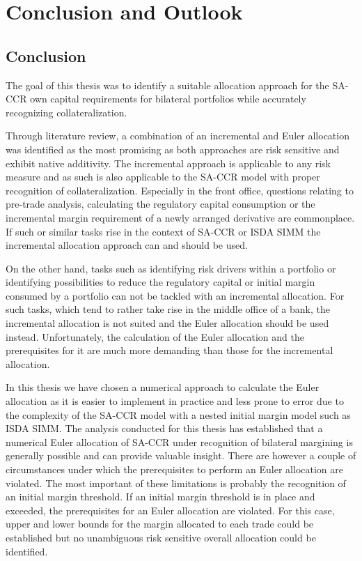 \documentclass[../Thesis_AHoecherl.tex]{subfiles}
\begin{document}
\chapter{Conclusion and Outlook}\label{sec:Outlook and Conclusion}
\section{Conclusion}\label{sec:Conclusion}
The goal of this thesis was to identify a suitable allocation approach for the \gls{SA-CCR} own capital requirements for bilateral portfolios while accurately recognizing collateralization.

Through literature review, a combination of an incremental and Euler allocation was identified as the most promising as both approaches are risk sensitive and exhibit native additivity. 
The incremental approach is applicable to any risk measure and as such is also applicable to the \gls{SA-CCR} model with proper recognition of collateralization. Especially in the front office, questions relating to pre-trade analysis, calculating the regulatory capital consumption or the incremental margin requirement of a newly arranged derivative are commonplace.
If such or similar tasks rise in the context of \gls{SA-CCR} or \gls{ISDA SIMM} the incremental allocation approach can and should be used.

On the other hand, tasks such as identifying risk drivers within a portfolio or identifying possibilities to reduce the regulatory capital or initial margin consumed by a portfolio can not be tackled with an incremental allocation.
For such tasks, which tend to rather take rise in the middle office of a bank, the incremental allocation is not suited and the Euler allocation should be used instead.
Unfortunately, the calculation of the Euler allocation and the prerequisites for it are much more demanding than those for the incremental allocation.

In this thesis we have chosen a numerical approach to calculate the Euler allocation as it is easier to implement in practice and less prone to error due to the complexity of the \gls{SA-CCR} model with a nested initial margin model such as \gls{ISDA SIMM}.
The analysis conducted for this thesis has established that a numerical Euler allocation of \gls{SA-CCR} under recognition of bilateral margining is generally possible and can provide valuable insight. There are however a couple of circumstances under which the prerequisites to perform an Euler allocation are violated.
The most important of these limitations is probably the recognition of an initial margin threshold. If an initial margin threshold is in place and exceeded, the prerequisites for an Euler allocation are violated. 
For this case, upper and lower bounds for the margin allocated to each trade could be established but no unambiguous risk sensitive overall allocation could be identified.
\end{document}
